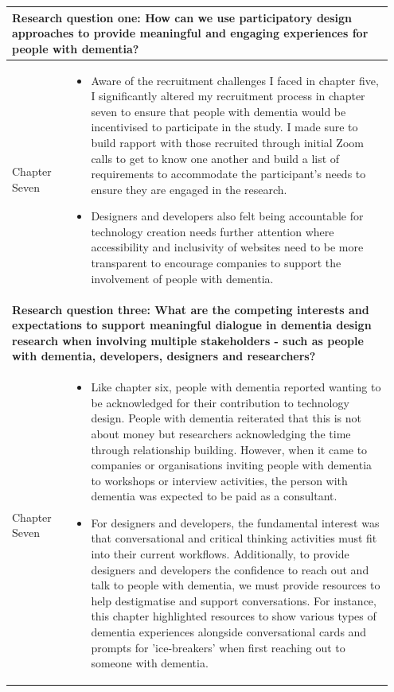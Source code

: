 \begin{table}[htp]
    \centering
    \begin{tabular}{p{0.15\linewidth} | p{0.8\linewidth}}
      \multicolumn{2}{p{0.95\linewidth}}{\textbf{Research question one: How can we use participatory design approaches to provide meaningful and engaging experiences for people with dementia?}} 
      \\   \hline
      Chapter Seven &
      \begin{itemize}
          \item Aware of the recruitment challenges I faced in chapter five, I significantly altered my recruitment process in chapter seven to ensure that people with dementia would be incentivised to participate in the study. I made sure to build rapport with those recruited through initial Zoom calls to get to know one another and build a list of requirements to accommodate the participant's needs to ensure they are engaged in the research.

          \item  Designers and developers also felt being accountable for technology creation needs further attention where accessibility and inclusivity of websites need to be more transparent to encourage companies to support the involvement of people with dementia.

      \end{itemize}
       \\ \hline
    \multicolumn{2}{p{0.95\linewidth}}{\textbf{Research question three: What are the competing interests and expectations to support meaningful dialogue in dementia design research when involving multiple stakeholders - such as people with dementia, developers, designers and researchers?}} \\ \hline
      Chapter Seven &
          \begin{itemize}
          \item Like chapter six, people with dementia reported wanting to be acknowledged for their contribution to technology design. People with dementia reiterated that this is not about money but researchers acknowledging the time through relationship building. However, when it came to companies or organisations inviting people with dementia to workshops or interview activities, the person with dementia was expected to be paid as a consultant. 
          \item For designers and developers, the fundamental interest was that conversational and critical thinking activities must fit into their current workflows. Additionally, to provide designers and developers the confidence to reach out and talk to people with dementia, we must provide resources to help destigmatise and support conversations. For instance, this chapter highlighted resources to show various types of dementia experiences alongside conversational cards and prompts for 'ice-breakers' when first reaching out to someone with dementia.


\end{itemize}
\end{tabular}
\end{table}
